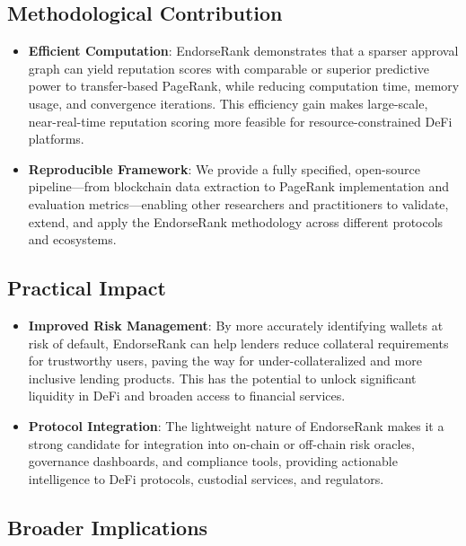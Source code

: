 \documentclass[
]{article}
\begin{document}
\subsection{Methodological Contribution}\label{methodological-contribution}

\begin{itemize}
\item
  \textbf{Efficient Computation}: EndorseRank demonstrates that a sparser approval graph can yield reputation scores with comparable or superior predictive power to transfer-based PageRank, while reducing computation time, memory usage, and convergence iterations. This efficiency gain makes large-scale, near-real-time reputation scoring more feasible for resource-constrained DeFi platforms.
\item
  \textbf{Reproducible Framework}: We provide a fully specified, open-source pipeline---from blockchain data extraction to PageRank implementation and evaluation metrics---enabling other researchers and practitioners to validate, extend, and apply the EndorseRank methodology across different protocols and ecosystems.
\end{itemize}

\subsection{Practical Impact}\label{practical-impact}

\begin{itemize}
\item
  \textbf{Improved Risk Management}: By more accurately identifying wallets at risk of default, EndorseRank can help lenders reduce collateral requirements for trustworthy users, paving the way for under-collateralized and more inclusive lending products. This has the potential to unlock significant liquidity in DeFi and broaden access to financial services.
\item
  \textbf{Protocol Integration}: The lightweight nature of EndorseRank makes it a strong candidate for integration into on-chain or off-chain risk oracles, governance dashboards, and compliance tools, providing actionable intelligence to DeFi protocols, custodial services, and regulators.
\end{itemize}

\subsection{Broader Implications}\label{broader-implications}
\end{document}
